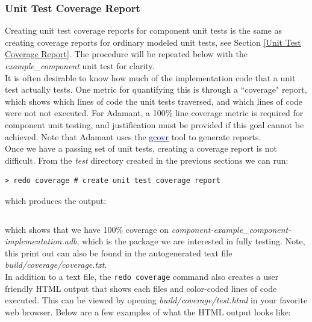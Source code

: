 \subsubsection{Unit Test Coverage Report}

Creating unit test coverage reports for component unit tests is the same as creating coverage reports for ordinary modeled unit tests, see Section \ref{Unit Test Coverage Report}. The procedure will be repeated below with the \textit{example\_component} unit test for clarity. \\

It is often desirable to know how much of the implementation code that a unit test actually tests. One metric for quantifying this is through a ``coverage" report, which shows which lines of code the unit tests traversed, and which lines of code were not not executed. For Adamant, a 100\% line coverage metric is required for component unit testing, and justification must be provided if this goal cannot be achieved. Note that Adamant uses the \href{https://gcovr.com/en/stable/}{\textcolor{blue}{gcovr}} tool to generate reports. \\

Once we have a passing set of unit tests, creating a coverage report is not difficult. From the \textit{test} directory created in the previous sections we can run:

\vspace{5mm} %
\begin{verbatim}
> redo coverage # create unit test coverage report
\end{verbatim}
\vspace{5mm} %

which produces the output:

\vspace{5mm} %
\inputminted{text}{../example_architecture/example_component/test3/build/coverage/coverage.txt}
\vspace{5mm} %

which shows that we have 100\% coverage on \textit{component-example\_component-implementation.adb}, which is the package we are interested in fully testing. Note, this print out can also be found in the autogenerated text file \textit{build/coverage/coverage.txt}. \\

In addition to a text file, the \texttt{redo coverage} command also creates a user friendly HTML output that shows each files and color-coded lines of code executed. This can be viewed by opening \textit{build/coverage/test.html} in your favorite web browser. Below are a few examples of what the HTML output looks like: \\


